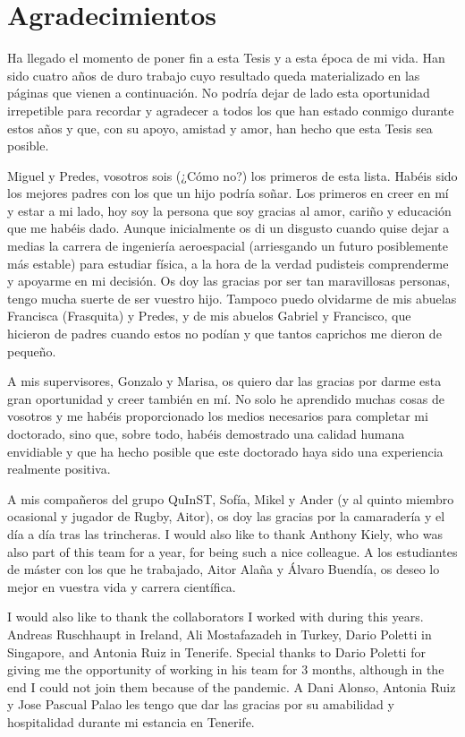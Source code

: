 \chapter{Agradecimientos} %
\label{agradecimientos}

Ha llegado el momento de poner fin a esta Tesis y a esta época de mi vida. Han sido cuatro años de duro trabajo cuyo resultado queda materializado en las páginas que vienen a continuación. No podría dejar de lado esta oportunidad irrepetible para recordar y agradecer a todos los que han estado conmigo durante estos años y que, con su apoyo, amistad y amor, han hecho que esta Tesis sea posible.

Miguel y Predes, vosotros sois (¿Cómo no?) los primeros de esta lista. Habéis sido los mejores padres con los que un hijo podría soñar. Los primeros en creer en mí y estar a mi lado, hoy soy la persona que soy gracias al amor, cariño y educación que me habéis dado. Aunque inicialmente os di un disgusto cuando quise dejar a medias la carrera de ingeniería aeroespacial (arriesgando un futuro posiblemente más estable) para estudiar física, a la hora de la verdad pudisteis comprenderme y apoyarme en mi decisión. Os doy las gracias por ser tan maravillosas personas, tengo mucha suerte de ser vuestro hijo. Tampoco puedo olvidarme de mis abuelas Francisca (Frasquita) y Predes, y de mis abuelos Gabriel y Francisco, que hicieron de padres cuando estos no podían y que tantos caprichos me dieron de pequeño.

A mis supervisores, Gonzalo y Marisa, os quiero dar las gracias por darme esta gran oportunidad y creer también en mí. No solo he aprendido muchas cosas de vosotros y me habéis proporcionado los medios necesarios para completar mi doctorado, sino que, sobre todo, habéis demostrado una calidad humana envidiable y que ha hecho posible que este doctorado haya sido una experiencia realmente positiva.

A mis compañeros del grupo QuInST, Sofía, Mikel y Ander (y al quinto miembro ocasional y jugador de Rugby, Aitor), os doy las gracias por la camaradería y el día a día tras las trincheras. I would also like to thank Anthony Kiely, who was also part of this team for a year, for being such a nice colleague. A los estudiantes de máster con los que he trabajado, Aitor Alaña y Álvaro Buendía, os deseo lo mejor en vuestra vida y carrera científica.

I would also like to thank the collaborators I worked with during this years. Andreas Ruschhaupt in Ireland, Ali Mostafazadeh in Turkey, Dario Poletti in Singapore, and Antonia Ruiz in Tenerife. Special thanks to Dario Poletti for giving me the opportunity of working in his team for 3 months, although in the end I could not join them because of the pandemic. A Dani Alonso, Antonia Ruiz y Jose Pascual Palao les tengo que dar las gracias por su amabilidad y hospitalidad durante mi estancia en Tenerife.

